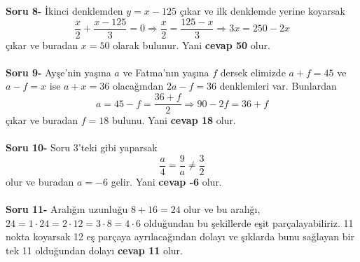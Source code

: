 \documentclass[a4paper,12pt,twocolumn]{article}
\begin{document}
\textbf{Soru 8-} İkinci denklemden $y=x-125$ çıkar ve ilk denklemde yerine koyarsak $$\frac{x}{2}+\frac{x-125}{3}=0\Rightarrow \frac{x}{2}=\frac{125-x}{3}\Rightarrow 3x=250-2x$$ çıkar ve buradan $x=50$ olarak bulunur. Yani \textbf{cevap 50} olur.
\\ \\
\textbf{Soru 9-} Ayşe'nin yaşına $a$ ve Fatma'nın yaşına $f$ dersek elimizde $a+f=45$ ve $a-f=x$ ise $a+x=36$ olacağından $2a-f=36$ denklemleri var. Bunlardan $$a=45-f=\frac{36+f}{2}\Rightarrow 90-2f=36+f$$ çıkar ve buradan $f=18$ bulunu. Yani \textbf{cevap 18} olur.
\\ \\
\textbf{Soru 10-} Soru 3'teki gibi yaparsak $$\frac{a}{4}=\frac{9}{a}\neq\frac{3}{2}$$ olur ve buradan $a=-6$ gelir. Yani \textbf{cevap -6} olur.
\\ \\
\textbf{Soru 11-} Aralığın uzunluğu $8+16=24$ olur ve bu aralığı, $24=1\cdot24=2\cdot12=3\cdot8=4\cdot6$ olduğundan bu şekillerde eşit parçalayabiliriz. 11 nokta koyarsak 12 eş parçaya ayrılacağından dolayı ve şıklarda bunu sağlayan bir tek 11 olduğundan dolayı \textbf{cevap 11} olur.
\end{document}
